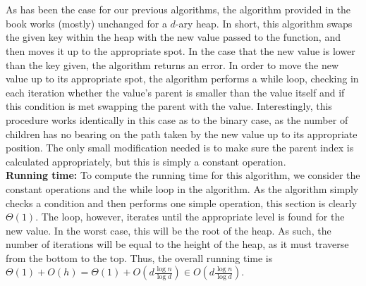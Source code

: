 \documentclass{article}
\begin{document}
\begin{enumerate}
\begin{enumerate}
\\\\ As has been the case for our previous algorithms, the algorithm provided in the book works (mostly) unchanged for a $d$-ary heap. In short, this algorithm swaps the given key within the heap with the new value passed to the function, and then moves it up to the appropriate spot. In the case that the new value is lower than the key given, the algorithm returns an error. In order to move the new value up to its appropriate spot, the algorithm performs a while loop, checking in each iteration whether the value's parent is smaller than the value itself and if this condition is met swapping the parent with the value. Interestingly, this procedure works identically in this case as to the binary case, as the number of children has no bearing on the path taken by the new value up to its appropriate position. The only small modification needed is to make sure the parent index is calculated appropriately, but this is simply a constant operation.
\\ \textbf{Running time:}
To compute the running time for this algorithm, we consider the constant operations and the while loop in the algorithm. As the algorithm simply checks a condition and then performs one simple operation, this section is clearly $\Theta(1)$. The loop, however, iterates until the appropriate level is found for the new value. In the worst case, this will be the root of the heap. As such, the number of iterations will be equal to the height of the heap, as it must traverse from the bottom to the top. Thus, the overall running time is $\Theta
(1)+O(h)=\Theta(1)+O(d\frac{\log n}{\log d})\in O(d\frac{\log n}{\log d})$.
	\end{enumerate}
\end{enumerate}
	
\end{document}
